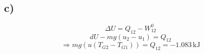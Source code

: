 

\subsection*{c)}
\[
\Delta U = Q_{12} - W_{12}^0
\]
\[
dU - m g (u_2 - u_1) = Q_{12}
\]
\[
\Rightarrow m g (u \left( T_{G2} - T_{G1} \right)) = Q_{12} = -1.083 \, \text{kJ}
\]
